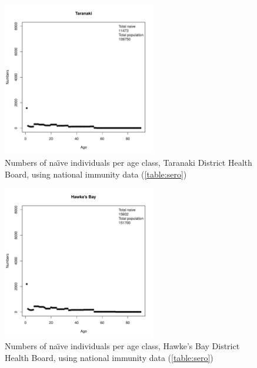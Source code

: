 \documentclass{article}
\begin{document}
\begin{figure}[H]
  \begin{center}
    \includegraphics[width=0.6\textwidth]{dhb9.pdf}
     \end{center}
     \caption{Numbers of na\"{\i}ve individuals per age class, Taranaki District Health Board, using national immunity data (\autoref{table:sero})}
     \label{fig:Taranaki}
\end{figure}

\begin{figure}[H]
     \begin{center}
     \includegraphics[width=0.6\textwidth]{dhb10.pdf}
     \end{center}
     \caption{Numbers of na\"{\i}ve individuals per age class, Hawke's Bay District Health Board, using national immunity data (\autoref{table:sero})}
     \label{fig:HawkesBay}
\end{figure}
\end{document}
